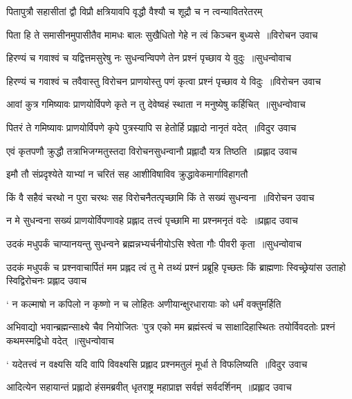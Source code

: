 \twolineshloka
{पितापुत्रौ सहासीतां द्वौ विप्रौ क्षत्रियावपि}
{वृद्धौ वैश्यौ च शूद्रौ च न त्वन्यावितरेतरम्}


\threelineshloka
{पिता हि ते समासीनमुपासीतैव मामधः}
{बालः सुखैधितो गेहे न त्वं किञ्चन बुध्यसे ॥विरोचन उवाच}
{}


\threelineshloka
{हिरण्यं च गवाश्वं च यद्वित्तमसुरेषु नः}
{सुधन्वन्विपणे तेन प्रश्नं पृच्छाव ये वुदुः ॥सुधन्वोवाच}
{}


\threelineshloka
{हिरण्यं च गवाश्वं च तवैवास्तु विरोचन}
{प्राणयोस्तु पणं कृत्वा प्रश्नं पृच्छाव ये विदुः ॥विरोचन उवाच}
{}


\threelineshloka
{आवां कुत्र गमिष्यावः प्राणयोर्विपणे कृते}
{न तु देवेष्वहं स्थाता न मनुष्येषु कर्हिचित् ॥सुधन्वोवाच}
{}


\threelineshloka
{पितरं ते गमिष्यावः प्राणयोर्विपणे कृपे}
{पुत्रस्यापि स हेतोर्हि प्रह्लादो नानृतं वदेत् ॥विदुर उवाच}
{}


\threelineshloka
{एवं कृतपणौ क्रुद्धौ तत्राभिजग्मतुस्तदा}
{विरोचनसुधन्वानौ प्रह्लादौ यत्र तिष्ठति ॥प्रह्लाद उवाच}
{}


\twolineshloka
{इमौ तौ संप्रदृश्येते याभ्यां न चरितं सह}
{आशीविषाविव क्रुद्धावेकमार्गाविहागतौ}


\threelineshloka
{किं वै सहैवं चरथो न पुरा चरथः सह}
{विरोचनैतत्पृच्छामि किं ते सख्यं सुधन्वना ॥विरोचन उवाच}
{}


\threelineshloka
{न मे सुधन्वना सख्यं प्राणयोर्विपणावहे}
{प्रह्लाद तत्त्वं पृच्छामि मा प्रश्नमनृतं वदेः ॥प्रह्लाद उवाच}
{}


\threelineshloka
{उदकं मधुपर्कं चाप्यानयन्तु सुधन्वने}
{ब्रह्मन्नभ्यर्चनीयोऽसि श्वेता गौः पीवरी कृता ॥सुधन्वोवाच}
{}


\fourlineindentedshloka
{उदकं मधुपर्कं च प्रश्नवाचार्पितं मम}
{प्रह्लद त्वं तु मे तथ्यं प्रश्नं प्रब्रूहि पृच्छतः}
{किं ब्राह्मणाः स्विच्छ्रेयांस उताहो स्विद्विरोचनः प्रह्लाद उवाच}
{}


\twolineshloka
{` न कल्माषो न कपिलो न कृष्णो न च लोहितः}
{अणीयान्क्षुरधारायाः को धर्मं वक्तुमर्हिति}


\fourlineindentedshloka
{अभिवाद्यो भवान्ब्रह्मन्साक्ष्ये चैव नियोजितः}
{'पुत्र एको मम ब्रह्मंस्त्वं च साक्षादिहास्थितः}
{तयोर्विवदतोः प्रश्नं कथमस्मद्विधो वदेत् ॥सुधन्वोवाच}
{}


\threelineshloka
{` यदेतत्त्वं न वक्ष्यसि यदि वापि विवक्ष्यसि}
{प्रह्लाद प्रश्नमतुलं मूर्धा ते विफलिष्यति ॥विदुर उवाच}
{}


\threelineshloka
{आदित्येन सहायान्तं प्रह्लादो हंसमब्रवीत्}
{धृतराष्ट्र महाप्राज्ञ सर्वज्ञं सर्वदर्शिनम् ॥प्रह्लाद उवाच}
{}


